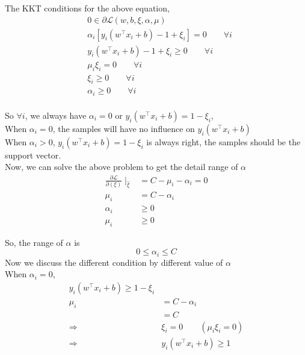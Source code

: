 \documentclass[a4paper]{article}
\begin{document}
The KKT conditions for the above equation, 
\begin{equation}
    \begin{aligned}
        & 0 \in \partial \mathcal{L}(w,b,\xi,\alpha,\mu) \\
        &\alpha_i [y_i(w^{\top} x_i + b) - 1+\xi_i] =0 \qquad \forall i \\
        & y_i(w^{\top} x_i + b) - 1+\xi_i \ge 0 \qquad \forall i\\
        & \mu_i \xi_i = 0 \qquad \forall i\\
        & \xi_i \ge 0 \qquad \forall i\\
        & \alpha_i \ge 0 \qquad \forall i\\
    \end{aligned}
\end{equation}

So $\forall i$, we always have $\alpha_i=0$ or $y_i(w^{\top} x_i + b) = 1 -\xi_i $, \\
When $\alpha_i = 0$, the samples will have no influence on $y_i(w^{\top} x_i + b)$\\
When $\alpha_i > 0$, $y_i(w^{\top} x_i + b) = 1 -\xi_i $ is always right, the samples should be the support vector.\\

Now, we can solve the above problem to get the detail range of $\alpha$ 
\begin{equation}
    \begin{aligned}
        \frac{\partial \mathcal{L}}{\partial(\xi)}\mid_{\hat{\xi}} &= C - \mu_i - \alpha_i= 0 \\
        \mu_i & = C- \alpha_i \\
        \alpha_i &\ge 0 \\
        \mu_i &\ge 0
    \end{aligned}
\end{equation}

So, the range of $\alpha$ is 
\begin{equation}
    0 \le \alpha_i \le C
\end{equation}
Now we discuss the different condition by different value of $\alpha$\\
When $\alpha_i = 0$, 
\begin{equation}
    \begin{aligned}
    y_i(w^{\top} x_i + b) \ge 1 -\xi_i \\
    \mu_i  & = C- \alpha_i \\
    & = C\\
    \Rightarrow & \xi_i = 0 \qquad (\mu_i \xi_i = 0 )\\
    \Rightarrow & y_i(w^{\top} x_i + b) \ge 1  
    \end{aligned}
\end{equation}
\end{document}
